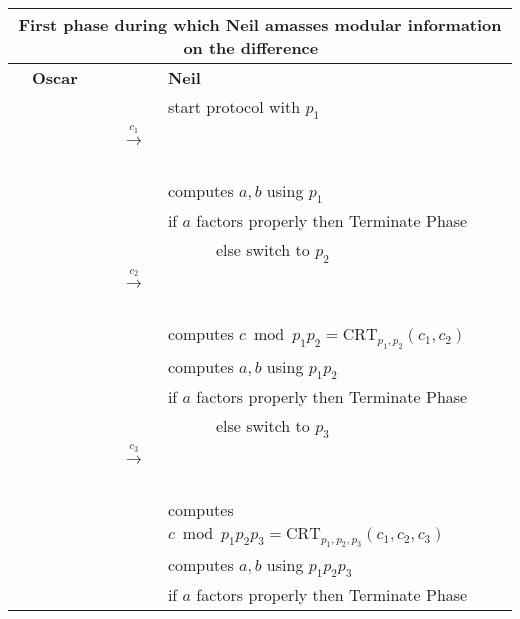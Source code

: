\documentclass[11pt]{llncs}
\begin{document}
\begin{center}
\begin{tabular}{|lcl|}\hline
\multicolumn{3}{|c|}{{\sf First phase during which Neil amasses modular information on the difference~~}} \\\hline
~~{\bf Oscar}                      &                                                      &   {\bf Neil}~\\
                                   &                                                      &start protocol with $p_1$~\\
                                   &~~{{\LARGE $\stackrel{c_1}{\longrightarrow}$}}~~      &   \\
                                   &                                                      &computes $a,b$ using $p_1$~\\
                                   &                                                      &if $a$ factors properly then {\sf Terminate Phase}\\
                                   &                                                      &~~~~~~else switch to $p_2$~~\\
                                   &~~{{\LARGE $\stackrel{c_2}{\longrightarrow}$}}~~      &   \\
                                   &                                                      &computes $c \bmod p_1 p_2=\mbox{CRT}_{p_1,p_2}(c_1,c_2)$~~\\
                                   &                                                      &computes $a,b$ using $p_1 p_2$~\\
                                   &                                                      &if $a$ factors properly then {\sf Terminate Phase}\\
                                   &                                                      &~~~~~~else switch to $p_3$~~\\
                                   &~~{{\LARGE $\stackrel{c_3}{\longrightarrow}$}}~~      &   \\
                                   &                                                      &computes $c \bmod p_1 p_2 p_3=\mbox{CRT}_{p_1,p_2,p_3}(c_1,c_2,c_3)$~~\\
                                   &                                                      &computes $a,b$ using $p_1 p_2 p_3$~\\
                                   &                                                      &if $a$ factors properly then {\sf Terminate Phase}\\

\end{tabular}
\end{center}
\end{document}

